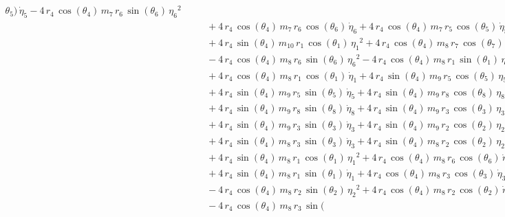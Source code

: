 \begin{eqnarray*}
{\theta_{5}})\,{\dot{\eta}_{5}} - 4\,r_{4}\,\cos({\theta_{4}})\,m_{7}
\,r_{6}\,\sin({\theta_{6}})\,{{\eta_{6}}}^2 \\ &&\quad\mbox{} + 4\,r_{
4}\,\cos({\theta_{4}})\,m_{7}\,r_{6}\,\cos({\theta_{6}})\,{\dot{\eta}
_{6}} + 4\,r_{4}\,\cos({\theta_{4}})\,m_{7}\,r_{5}\,\cos({\theta_{5}})
\,{\dot{\eta}_{5}} \\ &&\quad\mbox{} + 4\,r_{4}\,\sin({\theta_{4}})\,m
_{10}\,r_{1}\,\cos({\theta_{1}})\,{{\eta_{1}}}^2 + 4\,r_{4}\,\cos({
\theta_{4}})\,m_{8}\,r_{7}\,\cos({\theta_{7}})\,{\dot{\eta}_{7}}
 \\ &&\quad\mbox{} - 4\,r_{4}\,\cos({\theta_{4}})\,m_{8}\,r_{6}\,\sin(
{\theta_{6}})\,{{\eta_{6}}}^2 - 4\,r_{4}\,\cos({\theta_{4}})\,m_{8}\,r
_{1}\,\sin({\theta_{1}})\,{{\eta_{1}}}^2 \\ &&\quad\mbox{} + 4\,r_{4}
\,\cos({\theta_{4}})\,m_{8}\,r_{1}\,\cos({\theta_{1}})\,{\dot{\eta}_{1
}} + 4\,r_{4}\,\sin({\theta_{4}})\,m_{9}\,r_{5}\,\cos({\theta_{5}})\,{
{\eta_{5}}}^2 \\ &&\quad\mbox{} + 4\,r_{4}\,\sin({\theta_{4}})\,m_{9}
\,r_{5}\,\sin({\theta_{5}})\,{\dot{\eta}_{5}} + 4\,r_{4}\,\sin({\theta
_{4}})\,m_{9}\,r_{8}\,\cos({\theta_{8}})\,{{\eta_{8}}}^2
 \\ &&\quad\mbox{} + 4\,r_{4}\,\sin({\theta_{4}})\,m_{9}\,r_{8}\,\sin(
{\theta_{8}})\,{\dot{\eta}_{8}} + 4\,r_{4}\,\sin({\theta_{4}})\,m_{9}
\,r_{3}\,\cos({\theta_{3}})\,{{\eta_{3}}}^2 \\ &&\quad\mbox{} + 4\,r_{
4}\,\sin({\theta_{4}})\,m_{9}\,r_{3}\,\sin({\theta_{3}})\,{\dot{\eta}
_{3}} + 4\,r_{4}\,\sin({\theta_{4}})\,m_{9}\,r_{2}\,\cos({\theta_{2}})
\,{{\eta_{2}}}^2 \\ &&\quad\mbox{} + 4\,r_{4}\,\sin({\theta_{4}})\,m_{
8}\,r_{3}\,\sin({\theta_{3}})\,{\dot{\eta}_{3}} + 4\,r_{4}\,\sin({
\theta_{4}})\,m_{8}\,r_{2}\,\cos({\theta_{2}})\,{{\eta_{2}}}^2
 \\ &&\quad\mbox{} + 4\,r_{4}\,\sin({\theta_{4}})\,m_{8}\,r_{1}\,\cos(
{\theta_{1}})\,{{\eta_{1}}}^2 + 4\,r_{4}\,\cos({\theta_{4}})\,m_{8}\,r
_{6}\,\cos({\theta_{6}})\,{\dot{\eta}_{6}} \\ &&\quad\mbox{} + 4\,r_{4
}\,\sin({\theta_{4}})\,m_{8}\,r_{1}\,\sin({\theta_{1}})\,{\dot{\eta}_{
1}} + 4\,r_{4}\,\cos({\theta_{4}})\,m_{8}\,r_{3}\,\cos({\theta_{3}})\,
{\dot{\eta}_{3}} \\ &&\quad\mbox{} - 4\,r_{4}\,\cos({\theta_{4}})\,m_{
8}\,r_{2}\,\sin({\theta_{2}})\,{{\eta_{2}}}^2 + 4\,r_{4}\,\cos({\theta
_{4}})\,m_{8}\,r_{2}\,\cos({\theta_{2}})\,{\dot{\eta}_{2}}
 \\ &&\quad\mbox{} - 4\,r_{4}\,\cos({\theta_{4}})\,m_{8}\,r_{3}\,\sin(

\end{eqnarray*}
